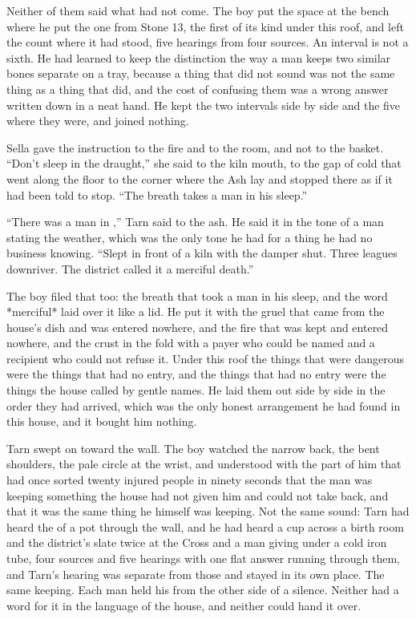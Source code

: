 Neither of them said what had not come. The boy put the space at the bench where he put the one from Stone 13, the first of its kind under this roof, and left the count where it had stood, five hearings from four sources. An interval is not a sixth. He had learned to keep the distinction the way a man keeps two similar bones separate on a tray, because a thing that did not sound was not the same thing as a thing that did, and the cost of confusing them was a wrong answer written down in a neat hand. He kept the two intervals side by side and the five where they were, and joined nothing.

Sella gave the instruction to the fire and to the room, and not to the basket. “Don't sleep in the draught,” she said to the kiln mouth, to the gap of cold that went along the floor to the corner where the Ash lay and stopped there as if it had been told to stop. “The breath takes a man in his sleep.”

“There was a man in ,” Tarn said to the ash. He said it in the tone of a man stating the weather, which was the only tone he had for a thing he had no business knowing. “Slept in front of a kiln with the damper shut. Three leagues downriver. The district called it a merciful death.”

The boy filed that too: the breath that took a man in his sleep, and the word *merciful* laid over it like a lid. He put it with the gruel that came from the house's dish and was entered nowhere, and the fire that was kept and entered nowhere, and the crust in the fold with a payer who could be named and a recipient who could not refuse it. Under this roof the things that were dangerous were the things that had no entry, and the things that had no entry were the things the house called by gentle names. He laid them out side by side in the order they had arrived, which was the only honest arrangement he had found in this house, and it bought him nothing.

Tarn swept on toward the wall. The boy watched the narrow back, the bent shoulders, the pale circle at the wrist, and understood with the part of him that had once sorted twenty injured people in ninety seconds that the man was keeping something the house had not given him and could not take back, and that it was the same thing he himself was keeping. Not the same sound: Tarn had heard the  of a pot through the wall, and he had heard a cup across a birth room and the district's slate twice at the Cross and a man giving under a cold iron tube, four sources and five hearings with one flat answer running through them, and Tarn's hearing was separate from those and stayed in its own place. The same keeping. Each man held his from the other side of a silence. Neither had a word for it in the language of the house, and neither could hand it over.

